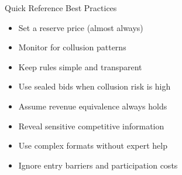 \documentclass[xcolor={x11names}]{beamer}
\begin{document}
\begin{frame}{Quick Reference Best Practices}
\begin{center}
\begin{tcolorbox}[colback=green!5,colframe=green!40!black,title=DO]
\begin{itemize}
  \item Set a reserve price (almost always)
  \item Monitor for collusion patterns
  \item Keep rules simple and transparent
  \item Use sealed bids when collusion risk is high
\end{itemize}
\end{tcolorbox}

\begin{tcolorbox}[colback=red!5,colframe=red!40!black,title=DON'T]
\begin{itemize}
  \item Assume revenue equivalence always holds
  \item Reveal sensitive competitive information
  \item Use complex formats without expert help
  \item Ignore entry barriers and participation costs
\end{itemize}
\end{tcolorbox}
\end{center}
\end{frame}
\end{document}
